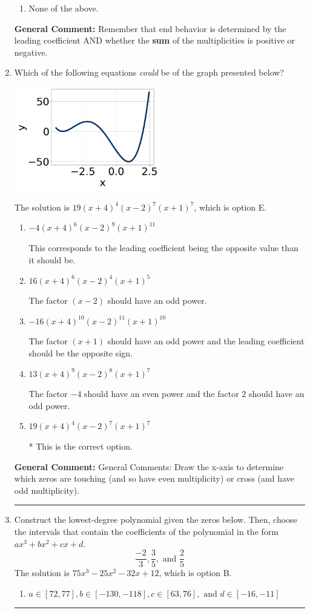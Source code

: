 \documentclass{extbook}[14pt]
\newcommand{\litem}[1]{\item #1

\rule{\textwidth}{0.4pt}}
\begin{document}
\begin{enumerate}
{\begin{enumerate}[label=\Alph*.]
\begin{multicols}{2}
\end{multicols}\item None of the above.\end{enumerate}
\textbf{General Comment:} Remember that end behavior is determined by the leading coefficient AND whether the \textbf{sum} of the multiplicities is positive or negative.
}
\litem{
Which of the following equations \textit{could} be of the graph presented below?

\begin{center}
    \includegraphics[width=0.5\textwidth]{../Figures/polyGraphToFunctionA.png}
\end{center}


The solution is \( 19(x + 4)^{4} (x - 2)^{7} (x + 1)^{7} \), which is option E.\begin{enumerate}[label=\Alph*.]
\item \( -4(x + 4)^{6} (x - 2)^{9} (x + 1)^{11} \)

This corresponds to the leading coefficient being the opposite value than it should be.
\item \( 16(x + 4)^{6} (x - 2)^{4} (x + 1)^{5} \)

The factor $(x - 2)$ should have an odd power.
\item \( -16(x + 4)^{10} (x - 2)^{11} (x + 1)^{10} \)

The factor $(x + 1)$ should have an odd power and the leading coefficient should be the opposite sign.
\item \( 13(x + 4)^{9} (x - 2)^{8} (x + 1)^{7} \)

The factor $-4$ should have an even power and the factor $2$ should have an odd power.
\item \( 19(x + 4)^{4} (x - 2)^{7} (x + 1)^{7} \)

* This is the correct option.
\end{enumerate}

\textbf{General Comment:} General Comments: Draw the x-axis to determine which zeros are touching (and so have even multiplicity) or cross (and have odd multiplicity).
}
\litem{
Construct the lowest-degree polynomial given the zeros below. Then, choose the intervals that contain the coefficients of the polynomial in the form $ax^3+bx^2+cx+d$.
\[ \frac{-2}{3}, \frac{3}{5}, \text{ and } \frac{2}{5} \]The solution is \( 75x^{3} -25 x^{2} -32 x + 12 \), which is option B.\begin{enumerate}[label=\Alph*.]
\item \( a \in [72, 77], b \in [-130, -118], c \in [63, 76], \text{ and } d \in [-16, -11] \)


\end{enumerate}}
\end{enumerate}
\end{document}
